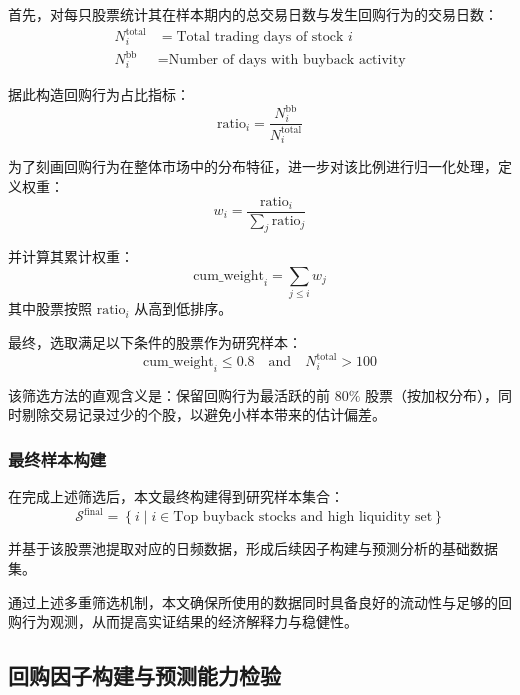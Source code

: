 \documentclass[a4paper,10pt]{article}
\begin{document}
首先，对每只股票统计其在样本期内的总交易日数与发生回购行为的交易日数：
\begin{align}
N_i^{\text{total}} &= \text{Total trading days of stock } i \\
N_i^{\text{bb}} &= \text{Number of days with buyback activity}
\end{align}

据此构造回购行为占比指标：
\begin{equation}
\text{ratio}_i = \frac{N_i^{\text{bb}}}{N_i^{\text{total}}}
\end{equation}

为了刻画回购行为在整体市场中的分布特征，进一步对该比例进行归一化处理，定义权重：
\begin{equation}
w_i = \frac{\text{ratio}_i}{\sum_{j} \text{ratio}_j}
\end{equation}

并计算其累计权重：
\begin{equation}
\text{cum\_weight}_i = \sum_{j \leq i} w_j
\end{equation}
其中股票按照 $\text{ratio}_i$ 从高到低排序。

最终，选取满足以下条件的股票作为研究样本：
\begin{equation}
\text{cum\_weight}_i \leq 0.8 \quad \text{and} \quad N_i^{\text{total}} > 100
\end{equation}

该筛选方法的直观含义是：保留回购行为最活跃的前 $80\%$ 股票（按加权分布），同时剔除交易记录过少的个股，以避免小样本带来的估计偏差。

\subsubsection{最终样本构建}

在完成上述筛选后，本文最终构建得到研究样本集合：
\begin{equation}
\mathcal{S}^{\text{final}} = \left\{ i \mid i \in \text{Top buyback stocks and high liquidity set} \right\}
\end{equation}

并基于该股票池提取对应的日频数据，形成后续因子构建与预测分析的基础数据集。

通过上述多重筛选机制，本文确保所使用的数据同时具备良好的流动性与足够的回购行为观测，从而提高实证结果的经济解释力与稳健性。





\subsection{回购因子构建与预测能力检验}
\end{document}
